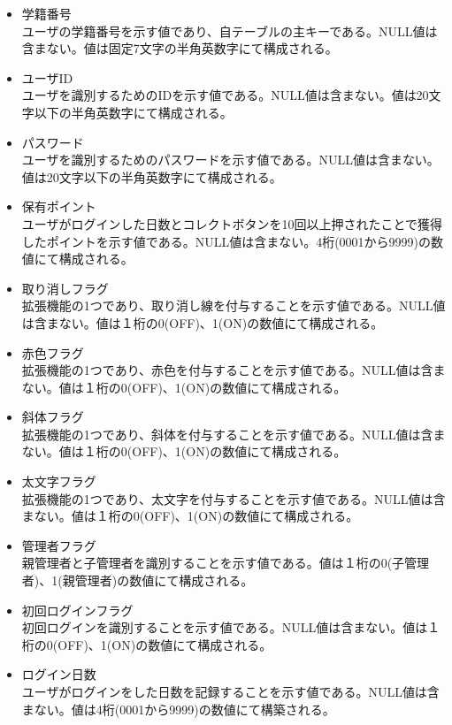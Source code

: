 \documentclass[a4j]{jarticle}
\begin{document}
\begin{itemize}
\item 学籍番号\\
  ユーザの学籍番号を示す値であり、自テーブルの主キーである。NULL値は含まない。値は固定7文字の半角英数字にて構成される。\\
\item ユーザID\\
  ユーザを識別するためのIDを示す値である。NULL値は含まない。値は20文字以下の半角英数字にて構成される。
\item パスワード\\
  ユーザを識別するためのパスワードを示す値である。NULL値は含まない。値は20文字以下の半角英数字にて構成される。\\
\item 保有ポイント\\
  ユーザがログインした日数とコレクトボタンを10回以上押されたことで獲得したポイントを示す値である。NULL値は含まない。4桁(0001から9999)の数値にて構成される。

\item 取り消しフラグ\\
  拡張機能の1つであり、取り消し線を付与することを示す値である。NULL値は含まない。値は１桁の0(OFF)、1(ON)の数値にて構成される。\\
  
\item 赤色フラグ\\
  拡張機能の1つであり、赤色を付与することを示す値である。NULL値は含まない。値は１桁の0(OFF)、1(ON)の数値にて構成される。\\
\item 斜体フラグ\\
  拡張機能の1つであり、斜体を付与することを示す値である。NULL値は含まない。値は１桁の0(OFF)、1(ON)の数値にて構成される。\\

\item 太文字フラグ\\
  拡張機能の1つであり、太文字を付与することを示す値である。NULL値は含まない。値は１桁の0(OFF)、1(ON)の数値にて構成される。\\

\item 管理者フラグ\\
  親管理者と子管理者を識別することを示す値である。値は１桁の0(子管理者)、1(親管理者)の数値にて構成される。\\
\item 初回ログインフラグ\\
  初回ログインを識別することを示す値である。NULL値は含まない。値は１桁の0(OFF)、1(ON)の数値にて構成される。
  
\item ログイン日数\\
  ユーザがログインをした日数を記録することを示す値である。NULL値は含まない。値は4桁(0001から9999)の数値にて構築される。
  
  　\end{itemize}
\newpage
\end{document}
